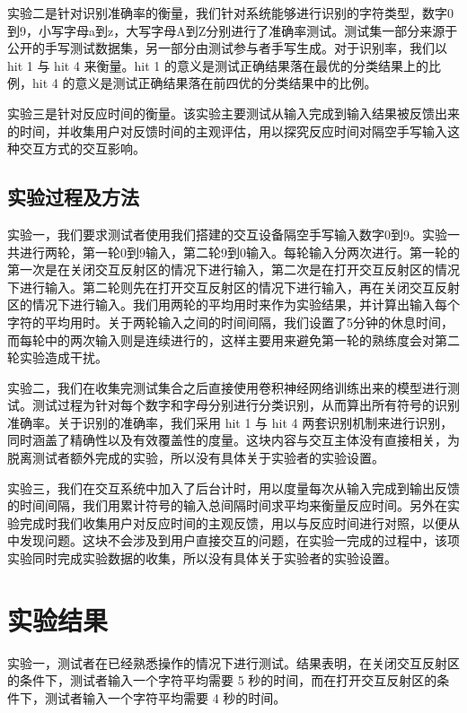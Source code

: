 \documentclass[10pt, twocolumn]{article}
\begin{document}
	实验二是针对识别准确率的衡量，我们针对系统能够进行识别的字符类型，数字0到9，小写字母a到z，大写字母A到Z分别进行了准确率测试。测试集一部分来源于公开的手写测试数据集，另一部分由测试参与者手写生成。对于识别率，我们以hit 1 与 hit 4 来衡量。hit 1 的意义是测试正确结果落在最优的分类结果上的比例，hit 4 的意义是测试正确结果落在前四优的分类结果中的比例。
	
	实验三是针对反应时间的衡量。该实验主要测试从输入完成到输入结果被反馈出来的时间，并收集用户对反馈时间的主观评估，用以探究反应时间对隔空手写输入这种交互方式的交互影响。

	\subsection{实验过程及方法}

	实验一，我们要求测试者使用我们搭建的交互设备隔空手写输入数字0到9。实验一共进行两轮，第一轮0到9输入，第二轮9到0输入。每轮输入分两次进行。第一轮的第一次是在关闭交互反射区的情况下进行输入，第二次是在打开交互反射区的情况下进行输入。第二轮则先在打开交互反射区的情况下进行输入，再在关闭交互反射区的情况下进行输入。我们用两轮的平均用时来作为实验结果，并计算出输入每个字符的平均用时。关于两轮输入之间的时间间隔，我们设置了5分钟的休息时间，而每轮中的两次输入则是连续进行的，这样主要用来避免第一轮的熟练度会对第二轮实验造成干扰。


	实验二，我们在收集完测试集合之后直接使用卷积神经网络训练出来的模型进行测试。测试过程为针对每个数字和字母分别进行分类识别，从而算出所有符号的识别准确率。关于识别的准确率，我们采用 hit 1 与 hit 4 两套识别机制来进行识别，同时涵盖了精确性以及有效覆盖性的度量。这块内容与交互主体没有直接相关，为脱离测试者额外完成的实验，所以没有具体关于实验者的实验设置。

	实验三，我们在交互系统中加入了后台计时，用以度量每次从输入完成到输出反馈的时间间隔，我们用累计符号的输入总间隔时间求平均来衡量反应时间。另外在实验完成时我们收集用户对反应时间的主观反馈，用以与反应时间进行对照，以便从中发现问题。这块不会涉及到用户直接交互的问题，在实验一完成的过程中，该项实验同时完成实验数据的收集，所以没有具体关于实验者的实验设置。


\section{实验结果}

实验一，测试者在已经熟悉操作的情况下进行测试。结果表明，在关闭交互反射区的条件下，测试者输入一个字符平均需要 5 秒的时间，而在打开交互反射区的条件下，测试者输入一个字符平均需要 4 秒的时间。
\end{document}
